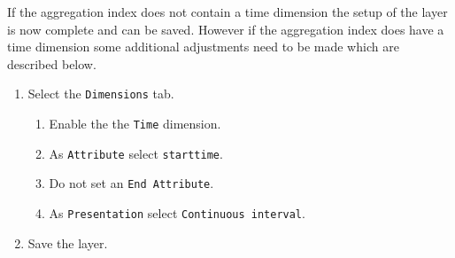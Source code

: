 \noindent If the aggregation index does not contain a time dimension the setup of the layer is now complete and can be saved. However if the aggregation index does have a time dimension some additional adjustments need to be made which are described below.

\begin{enumerate}[resume]
	\item Select the \lstinline|Dimensions| tab.
	\begin{enumerate}
		\item Enable the the \lstinline|Time| dimension.
		\item As \lstinline|Attribute| select \lstinline|starttime|.
		\item Do not set an \lstinline|End Attribute|.
		\item As \lstinline|Presentation| select \lstinline|Continuous interval|.
	\end{enumerate}
	\item Save the layer.
\end{enumerate}

